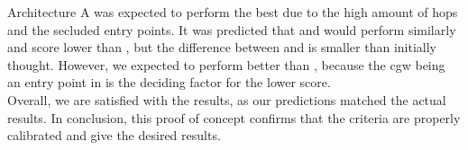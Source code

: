 Architecture A was expected to perform the best due to the high amount of hops and the secluded entry points.
It was predicted that  and  would perform similarly and score lower than ,
but the difference between  and  is smaller than initially thought. 
However, we expected  to perform better than , 
because the \acrshort{cgw} being an entry point in  is the deciding factor for the lower score.\\

Overall, we are satisfied with the results, as our predictions matched the actual results.
In conclusion, this proof of concept confirms that the criteria are properly calibrated and give the desired results.
